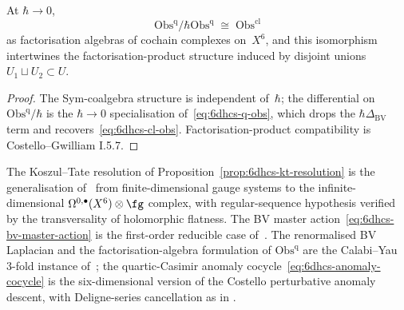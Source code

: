 \begin{theorem}
\label{thm:6dhcs-cl-limit}
At $\hbar \to 0$,
\[
 \mathrm{Obs}^{\mathrm{q}} / \hbar \mathrm{Obs}^{\mathrm{q}}
 \;\cong\;
 \mathrm{Obs}^{\mathrm{cl}}
\]
as factorisation algebras of cochain complexes on~$X^6$, and this
isomorphism intertwines the factorisation-product structure induced
by disjoint unions $U_1 \sqcup U_2 \subset U$.
\end{theorem}

\begin{proof}
The Sym-coalgebra structure is independent of~$\hbar$; the
differential on~$\mathrm{Obs}^{\mathrm{q}}/\hbar$ is the $\hbar \to 0$
specialisation of~\eqref{eq:6dhcs-q-obs}, which drops the
$\hbar \Delta_{\mathrm{BV}}$ term and recovers~\eqref{eq:6dhcs-cl-obs}.
Factorisation-product compatibility is Costello--Gwilliam I.5.7.
\end{proof}

\begin{remark}
\label{rem:6dhcs-ht-costello}
The Koszul--Tate resolution of
Proposition~\ref{prop:6dhcs-kt-resolution} is the generalisation
of~\cite[\S10]{HenneauxTeitelboim1992} from finite-dimensional gauge
systems to the infinite-dimensional $\Omega^{0,\bullet}(X^6) \otimes
\fg$ complex, with regular-sequence hypothesis verified by the
transversality of holomorphic flatness. The BV master
action~\eqref{eq:6dhcs-bv-master-action} is the first-order
reducible case of~\cite[\S18.2]{HenneauxTeitelboim1992}.
The renormalised BV Laplacian and the factorisation-algebra
formulation of $\mathrm{Obs}^{\mathrm{q}}$ are the Calabi--Yau
3-fold instance of~\cite[Ch.~5]{costello-renormalization}; the
quartic-Casimir anomaly cocycle~\eqref{eq:6dhcs-anomaly-cocycle} is
the six-dimensional version of the Costello perturbative anomaly
descent, with Deligne-series cancellation as in
\cite{Costello2017M5}.
\end{remark}

